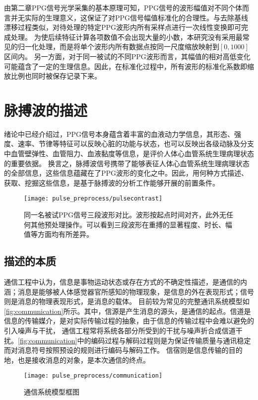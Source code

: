 由第二章PPG信号光学采集的基本原理可知，PPG信号的波形幅值对不同个体而言并无实际的生理意义，这保证了对PPG信号幅值标准化的合理性。与去除基线漂移过程类似，对待处理的特定PPG波形内所有采样点进行一次线性变换即可完成处理。
为使后续特征计算各项数值不会出现大量的小数，本研究没有采用最常见的归一化处理，而是将单个波形内所有数据点按同一尺度缩放映射到$[0,1000]$区间内。
另一方面，对于同一被试的不同PPG波形而言，其幅值的相对高低变化可能蕴含了一定的生理信息。因此，在标准化过程中，所有波形的标准化系数即缩放比例也同时被保存记录下来。

\section{脉搏波的描述}
绪论中已经介绍过，PPG信号本身蕴含着丰富的血液动力学信息，其形态、强度、速率、节律等特征可以反映心脏的功能与状态，也可以反映出各级动脉及分支中血管壁弹性、血管阻力、血液黏度等信息，是评价人体心血管系统生理病理状态的重要依据\cite{PPGYY}。
换言之，脉搏波信号携带了能够表征人体心血管系统生理病理状态的全部信息，这些信息蕴藏在了PPG波形的变化之中。因此，用何种方式描述、获取、挖掘这些信息，是基于脉搏波的分析工作能够开展的前置条件。
\begin{figure}[htbp]
    \centering
    \texttt{[image: pulse\_preprocess/pulsecontrast]}
    \caption[同一名被试PPG信号三段波形对比]{\label{fig:pulsecontrast}同一名被试PPG信号三段波形对比。波形按起点时间对齐，此外无任何其他预处理操作。可以看到三段波形在重搏的显著程度、时长、幅值等方面均有所差异。}
\end{figure}
\subsection{描述的本质}
通信工程中认为，信息是事物运动状态或存在方式的不确定性描述，是通信的内涵；消息是能够被人体感觉器官所感知的物理现象，是信息的外在表现形式；信号则是消息的物理表现形式，是消息的载体\cite{Shannon1948,Liu2019,Zhao2017}。
目前较为常见的完整通讯系统模型如\autoref{fig:communication}所示。其中，信源是产生消息的源头，是通信的起点。信道是信息的传输媒介，是对实际传输过程的抽象，由于信息的传输过程中会难以避免的引入噪声与干扰，
通信工程常将系统各部分所受到的干扰与噪声折合成信道干扰。\autoref{fig:communication}中的编码过程与解码过程则是为保证传输质量与通讯稳定而对消息符号按照预设的规则进行编码与解码工作。
信宿则是信息传输的目的地，也是接收消息的对象，是本次通信的终点\cite{Zhao2017}。
\begin{figure}[htbp]
    \centering
    \texttt{[image: pulse\_preprocess/communication]}
    \caption[通信系统模型框图]{\label{fig:communication}通信系统模型框图\cite{Zhao2017,Liu2019}}
\end{figure}


